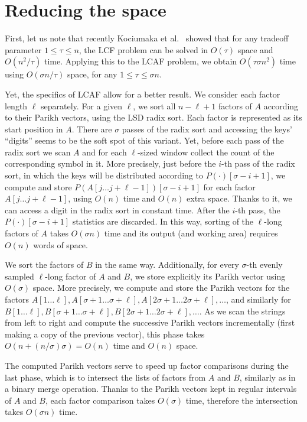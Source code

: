 \documentclass{llncs}
\begin{document}
\section{Reducing the space}
\noindent
First, let us note that recently Kociumaka et al.~\cite{KSV2014}
showed that for any tradeoff parameter $1 \leq \tau \leq n$, 
the LCF problem can be solved in $O(\tau)$ space and $O(n^2/\tau)$ time.
Applying this to the LCAF problem, we obtain 
$O(\tau \sigma n^2)$ time using $O(\sigma n/\tau)$ space, 
for any $1 \leq \tau \leq \sigma n$.

Yet, the specifics of LCAF allow for a better result.
We consider each factor length $\ell$ separately.
For a given $\ell$, we sort all $n-\ell+1$ factors of $A$ 
according to their Parikh vectors, using the LSD radix sort.
Each factor is represented as its start position in $A$.
There are $\sigma$ passes of the radix sort and accessing the keys' 
``digits'' seems to be the soft spot of this variant.
Yet, before each pass of the radix sort 
we scan $A$ and for each $\ell$-sized window collect the count 
of the corresponding symbol in it.
More precisely, just before the $i$-th pass of the radix sort, 
in which the keys will be distributed according to $P(\cdot)[\sigma-i+1]$, 
we compute and store $P(A[j \ldots j+\ell-1])[\sigma-i+1]$ for each factor $A[j \ldots j+\ell-1]$, 
using $O(n)$ time and $O(n)$ extra space.
Thanks to it, we can access a digit in the radix sort in constant time.
After the $i$-th pass, the $P(\cdot)[\sigma-i+1]$ statistics are discarded.
In this way, sorting of the $\ell$-long factors of $A$ takes $O(\sigma n)$ 
time and its output (and working area) requires $O(n)$ words of space.

We sort the factors of $B$ in the same way.
Additionally, for every $\sigma$-th evenly sampled $\ell$-long factor 
of $A$ and $B$, we store explicitly its Parikh vector using $O(\sigma)$ space.
More precisely, we compute and store the Parikh vectors for 
the factors $A[1 \ldots \ell], A[\sigma+1 \ldots \sigma+\ell], 
A[2\sigma+1 \ldots 2\sigma+\ell], \ldots$, 
and similarly for 
$B[1 \ldots \ell], B[\sigma+1 \ldots \sigma+\ell], 
B[2\sigma+1 \ldots 2\sigma+\ell], \ldots$.
As we scan the strings from left to right and compute the successive 
Parikh vectors incrementally (first making a copy of the previous vector), 
this phase takes $O(n + (n/\sigma)\sigma) = O(n)$ time and $O(n)$ space. 

The computed Parikh vectors serve to speed up factor comparisons 
during the last phase, which is to intersect the lists of factors 
from $A$ and $B$, similarly as in a binary merge operation.
Thanks to the Parikh vectors kept in regular intervals of $A$ and $B$, 
each factor comparison takes $O(\sigma)$ time, therefore the 
intersection takes $O(\sigma n)$ time.
\end{document}
